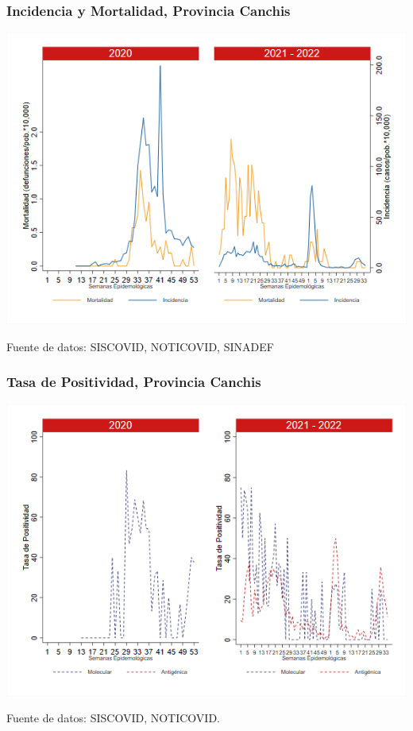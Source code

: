 \documentclass[xcolor=table]{beamer}
\begin{document}
\begin{frame}[label=Canchis]
	\frametitle{Incidencia y Mortalidad, Provincia Canchis}
	\vspace{-.5cm}
	\begin{center}
		\includegraphics[width=0.8\linewidth, trim={0cm .5cm 0cm 0.2cm},clip]{../figuras/incidencia_mortalidad_20_21_5.png}
	\end{center}
	{\tiny Fuente de datos: SISCOVID, NOTICOVID, SINADEF}
\end{frame}

\begin{frame}
	\frametitle{Tasa de Positividad, Provincia Canchis}
	\vspace{-.5cm}
	\begin{center}
		\includegraphics[width=0.8\linewidth, trim={0cm .5cm 0cm 0.2cm},clip]{../figuras/positividad_20_21_5.png}
	\end{center}
	{\tiny Fuente de datos: SISCOVID, NOTICOVID.}
\end{frame}
\end{document}
